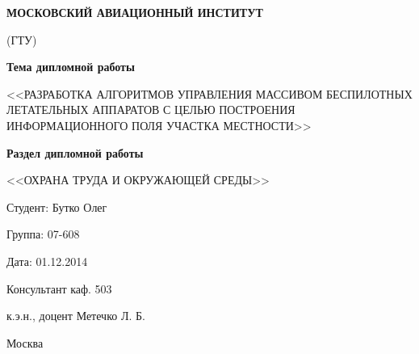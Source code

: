 \begin{titlepage}
\newpage

\begin{center}

    \textbf{МОСКОВСКИЙ АВИАЦИОННЫЙ ИНСТИТУТ}

    (ГТУ)

\end{center}

\vspace{\fill}

\begin{center}

    \textbf{Тема дипломной работы}

    <<РАЗРАБОТКА АЛГОРИТМОВ УПРАВЛЕНИЯ МАССИВОМ БЕСПИЛОТНЫХ
    ЛЕТАТЕЛЬНЫХ АППАРАТОВ С ЦЕЛЬЮ ПОСТРОЕНИЯ ИНФОРМАЦИОННОГО
    ПОЛЯ УЧАСТКА МЕСТНОСТИ>>

    \vspace{0.5em}

    \textbf{Раздел дипломной работы}

    <<ОХРАНА ТРУДА И ОКРУЖАЮЩЕЙ СРЕДЫ>>

\end{center}

\vspace{\fill}

\begin{flushright}
    Студент: Бутко Олег

    Группа: 07-608

    Дата: 01.12.2014

    Консультант каф. 503

    к.э.н., доцент Метечко Л. Б.

\end{flushright}

\vspace{\fill}

\begin{center}
    Москва
\end{center}

\end{titlepage}
